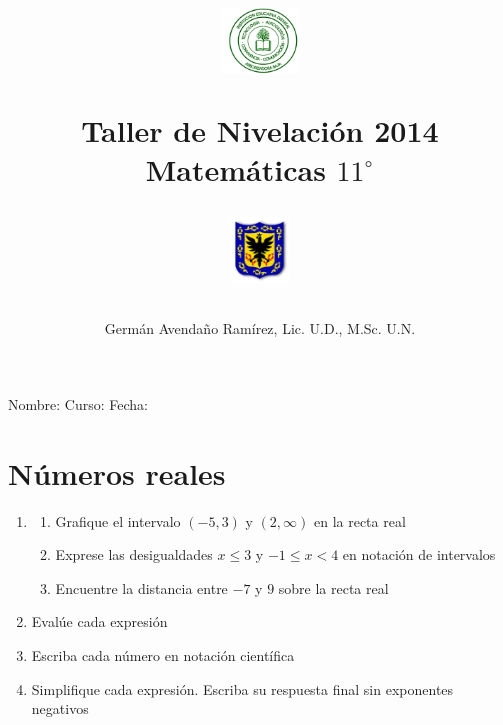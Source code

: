 \documentclass[10pt,twoside]{article}
\author{Germ\'an Avenda\~no Ram\'irez, Lic. U.D., M.Sc. U.N.}
\title{\begin{minipage}{.2\textwidth}
\includegraphics[height=1.75cm]{Images/logo-colegio.png}\end{minipage}
\begin{minipage}{.55\textwidth}
\begin{center}
Taller de Nivelación 2014\\
Matemáticas $11^{\circ}$
\end{center}
\end{minipage}\hfill
\begin{minipage}{.2\textwidth}
\includegraphics[height=1.75cm]{Images/logo-sed.png} 
\end{minipage}}
\date{}
\begin{document}
\maketitle
Nombre: \hrulefill Curso: \underline{\hspace*{44pt}} Fecha: \underline{\hspace*{2.5cm}}
\let\ds\displaystyle
\section*{N\'{u}meros reales}
\begin{enumerate}
\item 
\begin{enumerate}
\item Grafique el intervalo $(-5,3)$ y $(2,\infty)$ en la recta real
\item Exprese las desigualdades $x\leq 3$ y $-1\leq x<4$ en notación de intervalos
\item Encuentre la distancia entre $-7$ y $9$ sobre la recta real
\end{enumerate}
\item Evalúe cada expresión
\begin{enumerate}
\end{enumerate}
\item Escriba cada n\'{u}mero en notaci\'{o}n cient\'{i}fica
\begin{enumerate}
\end{enumerate}
\item Simplifique cada expresión. Escriba su respuesta final sin exponentes negativos
\begin{enumerate}
\end{enumerate}
\end{enumerate}
\end{document}
